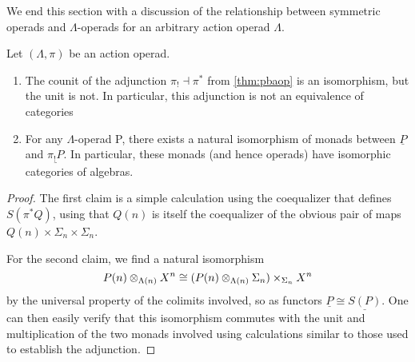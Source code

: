 We end this section with a discussion of the relationship between symmetric operads and $\Lambda$-operads for an arbitrary action operad $\Lambda$.

\begin{thm}\label{thm_sym}
Let $(\Lambda, \pi)$ be an action operad.
\begin{enumerate}
\item The counit of the adjunction $\pi_{!} \dashv \pi^*$ from \cref{thm:pbaop} is an isomorphism, but the unit is not. In particular, this adjunction is not an equivalence of categories
\item For any $\Lambda$-operad P, there exists a natural isomorphism of monads between $\underline{P}$ and $\underline{\pi_{!}P}$. In particular, these monads (and hence operads) have isomorphic categories of algebras.
\end{enumerate}
\end{thm}
\begin{proof}
The first claim is a simple calculation using the coequalizer that defines $S(\pi^{*}Q)$, using that $Q(n)$ is itself the coequalizer of the obvious pair of maps $Q(n) \times \Sigma_{n} \times \Sigma_{n}$.

For the second claim, we find a natural isomorphism
  \[
    P(n) \otimes_{\Lambda(n)} X^{n} \cong (P(n) \otimes_{\Lambda(n)} \Sigma_{n}) \times_{\Sigma_{n}} X^{n}
  \]
by the universal property of the colimits involved, so as functors $\underline{P} \cong \underline{S(P)}$. One can then easily verify that this isomorphism commutes with the unit and multiplication of the two monads involved using calculations similar to those used to establish the adjunction.
\end{proof}

%

